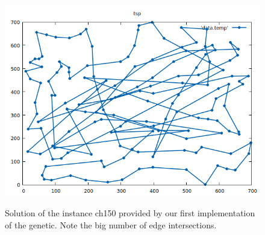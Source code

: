 \begin{figure}[h!]
\centering
	\includegraphics[scale=0.6]{media/genetic.png} \\
	\caption{Solution of the instance ch150 provided by our first implementation of the genetic. Note the big number of edge intersections.}
	\label{fig:geneticplot}
\end{figure}

